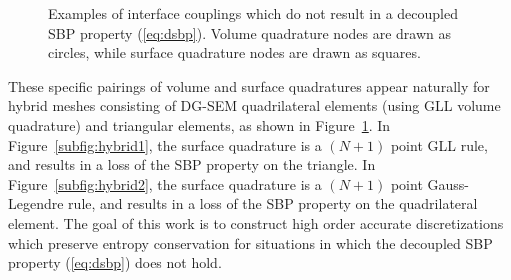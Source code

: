 \documentclass[review]{siamart0216}
\theoremstyle{assumption}
\begin{document}
\begin{figure}
\centering
\begingroup
\captionsetup[subfigure]{width=.425\textwidth}
\endgroup
\hspace{2em}
\caption{Examples of interface couplings which do not result in a decoupled SBP property (\ref{eq:dsbp}). Volume quadrature nodes are drawn as circles, while surface quadrature nodes are drawn as  squares. }
\label{fig:hybrid}
\end{figure}

These specific pairings of volume and surface quadratures appear naturally for hybrid meshes consisting of DG-SEM quadrilateral elements (using GLL volume quadrature) and triangular elements, as shown in Figure~\ref{fig:hybrid}.  In Figure~\ref{subfig:hybrid1}, the surface quadrature is a $(N+1)$ point GLL rule, and results in a loss of the SBP property on the triangle.  In Figure~\ref{subfig:hybrid2}, the surface quadrature is a $(N+1)$ point Gauss-Legendre rule, and results in a loss of the SBP property on the quadrilateral element.  The goal of this work is to construct high order accurate discretizations which preserve entropy conservation for situations in which the decoupled SBP property (\ref{eq:dsbp}) does not hold.  
\end{document}
